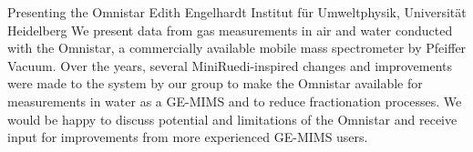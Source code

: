 \begin{conf-abstract}
{Presenting the Omnistar}
{Edith Engelhardt}
{Institut für Umweltphysik, Universität Heidelberg}
{We present data from gas measurements in air and water conducted with the Omnistar, a commercially available mobile mass spectrometer by Pfeiffer Vacuum. Over the years, several MiniRuedi-inspired changes and improvements were made to the system by our group to make the Omnistar available for measurements in water as a GE-MIMS and to reduce fractionation processes. We would be happy to discuss potential and limitations of the Omnistar and receive input for improvements from more experienced GE-MIMS users.}
\end{conf-abstract}
